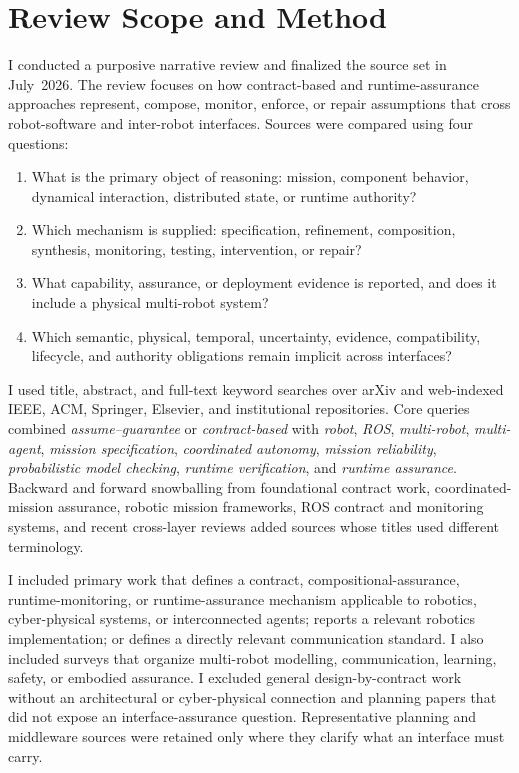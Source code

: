 \section{Review Scope and Method}
\label{sec:scope}

I conducted a purposive narrative review and finalized the source set in
July~2026.  The review focuses on how contract-based and runtime-assurance
approaches represent, compose, monitor, enforce, or repair assumptions that
cross robot-software and inter-robot interfaces.  Sources were compared using
four questions:

\begin{enumerate}
  \item What is the primary object of reasoning: mission, component behavior,
    dynamical interaction, distributed state, or runtime authority?
  \item Which mechanism is supplied: specification, refinement, composition,
    synthesis, monitoring, testing, intervention, or repair?
  \item What capability, assurance, or deployment evidence is reported, and
    does it include a physical multi-robot system?
  \item Which semantic, physical, temporal, uncertainty, evidence,
    compatibility, lifecycle, and authority obligations remain implicit across
    interfaces?
\end{enumerate}

I used title, abstract, and full-text keyword searches over arXiv and
web-indexed IEEE, ACM, Springer, Elsevier, and institutional repositories.  Core
queries combined \emph{assume--guarantee} or \emph{contract-based} with
\emph{robot}, \emph{ROS}, \emph{multi-robot}, \emph{multi-agent},
\emph{mission specification}, \emph{coordinated autonomy}, \emph{mission
reliability}, \emph{probabilistic model checking}, \emph{runtime verification},
and \emph{runtime assurance}.  Backward and forward snowballing from
foundational contract work, coordinated-mission assurance, robotic mission
frameworks, ROS contract and monitoring systems, and recent cross-layer reviews
added sources whose titles used different terminology.

I included primary work that defines a contract, compositional-assurance,
runtime-monitoring, or runtime-assurance mechanism applicable to robotics,
cyber-physical systems, or interconnected agents; reports a relevant robotics
implementation; or defines a directly relevant communication standard.  I also
included surveys that organize multi-robot modelling, communication, learning,
safety, or embodied assurance.  I excluded general design-by-contract work
without an architectural or cyber-physical connection and planning papers that
did not expose an interface-assurance question.  Representative planning and
middleware sources were retained only where they clarify what an interface must
carry.

